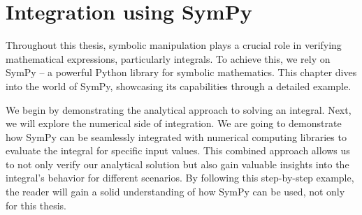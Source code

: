 \chapter{Integration using SymPy}\label{ch:intsympy}

Throughout this thesis,
symbolic manipulation plays a crucial role in verifying mathematical expressions,
particularly integrals.
To achieve this,
we rely on SymPy\autocite{10.7717/peerj-cs.103} --
a powerful Python library for symbolic mathematics.
This chapter dives into the world of SymPy,
showcasing its capabilities through a detailed example.

We begin by demonstrating the analytical approach to solving an integral.
Next, we will explore the numerical side of integration.
We are going to demonstrate how SymPy can be seamlessly integrated with numerical computing libraries
to evaluate the integral for specific input values.
This combined approach allows us to not only verify our analytical solution
but also gain valuable insights into the integral's behavior for different scenarios.
By following this step-by-step example,
the reader will gain a solid understanding of how SymPy can be used,
not only for this thesis.




